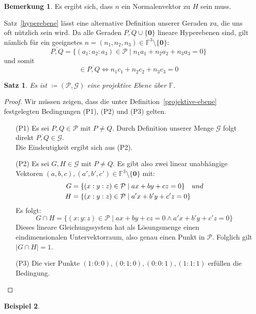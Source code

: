 \documentclass[hidelinks]{article}
\theoremstyle{plain}
\newtheorem{thm}{Satz}[section]
\theoremstyle{definition}
\newtheorem{bsp}[thm]{Beispiel}
\theoremstyle{rem}
\newtheorem*{remark}{Bemerkung}
\newcommand{\pgtwo}{PG(2, $\mathbb{F}$)\ }
\newcommand{\ftnz}{\mathbb{F}^{3}\setminus\{\boldsymbol 0\}}
\begin{document}
\begin{sloppypar}
\begin{remark}
Es ergibt sich, dass $n$ ein Normalenvektor zu $H$ sein muss.
\end{remark}
Satz~\ref{hyperebene} lässt eine alternative Definition unserer Geraden zu, die uns oft nützlich sein wird. Da alle Geraden $\overline{P,Q}\cup\{\boldsymbol 0\}$ lineare Hyperebenen sind, gilt nämlich für ein geeignetes \mbox{$n=(n_1,n_2,n_3)\in\ftnz$}:
\begin{equation*}
	\overline{P,Q}=\{(a_1:a_2:a_3)\in\mathcal{P}\mid n_1a_1+n_2a_2+n_3a_3=0\}
\end{equation*}
und somit
\begin{equation*}
	[c]\in\overline{P,Q}\Leftrightarrow n_1c_1+n_2c_2+n_3c_3=0
\end{equation*}

\begin{thm}
	Es ist \normalfont{\pgtwo}$\coloneqq(\mathcal{P},\mathcal{G})$ eine projektive Ebene über $\mathbb{F}$.
\end{thm}
\begin{proof}
	Wir müssen zeigen, dass die unter Definition~\ref{projektive-ebene} festgelegten Bedingungen (P1), (P2) und (P3) gelten.
\begin{enumerate}
	\item[(P1)] Es sei $P,Q\in\mathcal{P}$ mit $P\ne Q$. Durch Definition unserer Menge $\mathcal{G}$ folgt direkt $\overline{P,Q}\in\mathcal{G}$.\\
	Die Eindeutigkeit ergibt sich aus (P2).
	\item[(P2)] Es sei $G,H\in\mathcal{G}$ mit $P\ne Q$. Es gibt also zwei linear unabhängige Vektoren $(a,b,c),(a',b',c')\in\ftnz$ mit:
	\begin{align*}
	G & = \{(x:y:z)\in\mathcal{P}\mid ax+by+cz=0\}\quad\normalfont{und}\\
	H & =\{(x:y:z)\in\mathcal{P}\mid a'x+b'y+c'z=0\}
	\end{align*}
	Es folgt:
	\begin{equation*}
		G\cap H=\{(x:y:z)\in\mathcal{P}\mid ax+by+cz=0\land a'x+b'y+c'z=0\}
	\end{equation*}
	Dieses lineare Gleichungssystem hat als Lösungsmenge einen eindimensionalen Untervektorraum, also genau einen Punkt in $\mathcal{P}$. Folglich gilt $|G\cap H|=1$.
	\item[(P3)] Die vier Punkte $(1:0:0),(0:1:0),(0:0:1),(1:1:1)$ erfüllen die Bedingung.
\end{enumerate}
\end{proof}
\begin{bsp}

\end{bsp}
\end{sloppypar}
\end{document}
